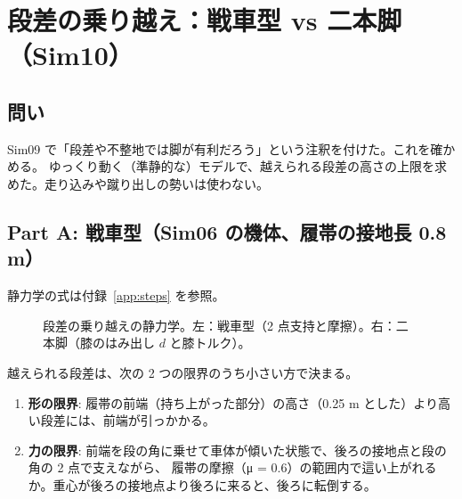 \chapter{段差の乗り越え：戦車型 vs 二本脚（Sim10）}\label{ch:steps}

\section{問い}

Sim09 で「段差や不整地では脚が有利だろう」という注釈を付けた。これを確かめる。 ゆっくり動く（準静的な）モデルで、越えられる段差の高さの上限を求めた。走り込みや蹴り出しの勢いは使わない。

\section{Part A: 戦車型（Sim06 の機体、履帯の接地長 0.8 m）}

静力学の式は付録~\ref{app:steps} を参照。

\begin{figure}[htbp]\centering
\resizebox{0.95\linewidth}{!}{}
\caption{段差の乗り越えの静力学。左：戦車型（2 点支持と摩擦）。右：二本脚（膝のはみ出し $d$ と膝トルク）。}\label{fig:tikz-steps}
\end{figure}


越えられる段差は、次の 2 つの限界のうち小さい方で決まる。

\begin{enumerate}
\def\labelenumi{\arabic{enumi}.}
\tightlist
\item
  \textbf{形の限界}: 履帯の前端（持ち上がった部分）の高さ（0.25 m とした）より高い段差には、前端が引っかかる。
\item
  \textbf{力の限界}: 前端を段の角に乗せて車体が傾いた状態で、後ろの接地点と段の角の 2 点で支えながら、 履帯の摩擦（μ = 0.6）の範囲内で這い上がれるか。重心が後ろの接地点より後ろに来ると、後ろに転倒する。
\end{enumerate}

